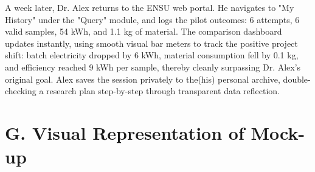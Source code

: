 \documentclass[11pt,a4paper]{article}
\begin{document}
A week later, Dr. Alex returns to the ENSU web portal. He navigates to "My History" under the "Query" module, and logs the pilot outcomes: 6 attempts, 6 valid samples, 54 kWh, and 1.1 kg of material. The comparison dashboard updates instantly, using smooth visual bar meters to track the positive project shift: batch electricity dropped by 6 kWh, material consumption fell by 0.1 kg, and efficiency reached 9 kWh per sample, thereby cleanly surpassing Dr. Alex's original goal. Alex saves the session privately to the(his) personal archive, double-checking a research plan step-by-step through transparent data reflection.



\section*{G. Visual Representation of Mock-up}
\end{document}
